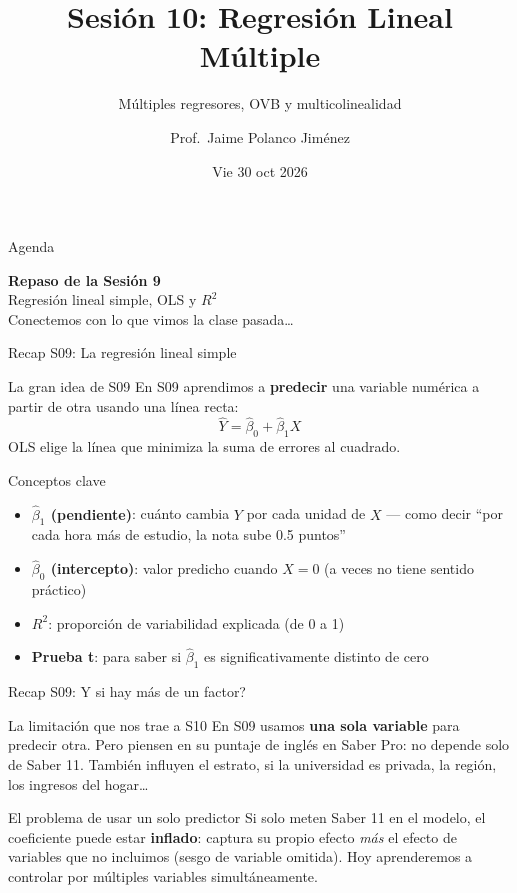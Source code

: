 \documentclass[aspectratio=169, 11pt]{beamer}
\title{Sesión 10: Regresión Lineal Múltiple}
\subtitle{Múltiples regresores, OVB y multicolinealidad}
\author{Prof.\ Jaime Polanco Jim\'enez}
\date{Vie 30 oct 2026}
\begin{document}
\begin{frame}
\titlepage
\end{frame}

\begin{frame}{Agenda}
\tableofcontents
\end{frame}

\begin{frame}{}
\vfill
\centering
{\Large\textbf{Repaso de la Sesi\'on 9}}\\[1em]
{\normalsize Regresi\'on lineal simple, OLS y $R^2$}\\[0.5em]
{\small Conectemos con lo que vimos la clase pasada\ldots}
\vfill
\end{frame}

\begin{frame}{Recap S09: La regresi\'on lineal simple}
\begin{exampleblock}{La gran idea de S09}
\small
En S09 aprendimos a \textbf{predecir} una variable num\'erica a partir de otra usando una l\'inea recta:
$$\hat{Y} = \hat{\beta}_0 + \hat{\beta}_1 X$$
OLS elige la l\'inea que minimiza la suma de errores al cuadrado.
\end{exampleblock}

\begin{block}{Conceptos clave}
\begin{itemize}\setlength{\itemsep}{2pt}
  \item \textbf{$\hat{\beta}_1$ (pendiente)}: cu\'anto cambia $Y$ por cada unidad de $X$ --- como decir ``por cada hora m\'as de estudio, la nota sube 0.5 puntos''
  \item \textbf{$\hat{\beta}_0$ (intercepto)}: valor predicho cuando $X = 0$ (a veces no tiene sentido pr\'actico)
  \item \textbf{$R^2$}: proporci\'on de variabilidad explicada (de 0 a 1)
  \item \textbf{Prueba t}: para saber si $\hat{\beta}_1$ es significativamente distinto de cero
\end{itemize}
\end{block}
\end{frame}

\begin{frame}{Recap S09: \textquestiondown{}Y si hay m\'as de un factor?}
\begin{exampleblock}{La limitaci\'on que nos trae a S10}
\small
En S09 usamos \textbf{una sola variable} para predecir otra. Pero piensen en su puntaje de ingl\'es en Saber Pro: no depende solo de Saber 11. Tambi\'en influyen el estrato, si la universidad es privada, la regi\'on, los ingresos del hogar\ldots
\end{exampleblock}

\begin{alertblock}{El problema de usar un solo predictor}
\small
Si solo meten Saber 11 en el modelo, el coeficiente puede estar \textbf{inflado}: captura su propio efecto \textit{m\'as} el efecto de variables que no incluimos (sesgo de variable omitida). Hoy aprenderemos a controlar por m\'ultiples variables simult\'aneamente.
\end{alertblock}
\end{frame}
\end{document}
